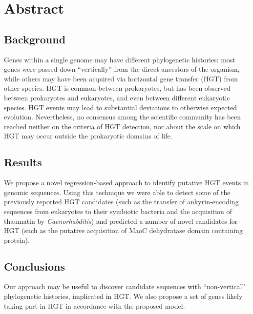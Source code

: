 \section{Abstract}
\label{abstract}

\subsection{Background}
\label{bg}
Genes within a single genome may have different phylogenetic histories: most
genes were passed down ``vertically'' from the direct ancestors of the
organism, while others may have been acquired via horizontal gene transfer
(HGT) from other species. HGT is common between prokaryotes, but has been
observed between prokaryotes and eukaryotes, and even between different
eukaryotic species. HGT events may lead to substantial deviations to otherwise
expected evolution.
Nevertheless, no consensus among the scientific community has been reached
neither on the criteria of HGT detection, nor about the scale on which HGT may
occur outside the prokaryotic domains of life.

\subsection{Results}
\label{res}
We propose a novel regression-based approach to identify putative HGT
events in genomic sequences. Using this technique we were able to detect some
of the previously reported HGT candidates (such as the transfer of
ankyrin-encoding sequences from eukaryotes to their symbiotic bacteria
and the acquisition of thaumatin by \textit{Caenorhabditis}) and predicted a
number of novel candidates for HGT (such as the putative acquisition of MaoC
dehydratase domain containing protein).

\subsection{Conclusions}
\label{concl}
Our approach may be useful to discover candidate sequences with
``non-vertical'' phylogenetic histories, implicated in HGT. We also propose a
set of genes likely taking part in HGT in accordance with the proposed model.
